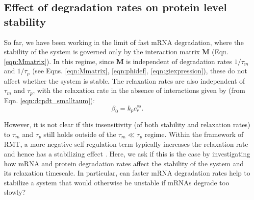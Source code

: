 \documentclass[10pt]{article}
\begin{document}




\subsection*{Effect of degradation rates on protein level stability}
So far, we have been working in the limit of fast mRNA degradation, where the stability of the system is governed only by the interaction matrix $\mathbf{M}$ (Eqn. \ref{eqn:Mmatrix}). In this regime, since $\mathbf{M}$ is independent of degradation rates $1/\tau_m$ and $1/\tau_p$ (see Eqns. \ref{eqn:Mmatrix}, \ref{eqn:phidef}, \ref{eqn:giexpression}), these do not affect whether the system is stable. The relaxation rates are also independent of $\tau_m$ and $\tau_p$, with the relaxation rate in the absence of interactions given by (from Eqn. \ref{eqn:dcpdt_smalltaum}):
\begin{equation}
    \beta_0 = k_p c_r^{ss}.
\end{equation}

However, it is not clear if this insensitivity (of both stability and relaxation rates) to $\tau_m$ and $\tau_p$ still holds outside of the $\tau_m \ll \tau_p$ regime. Within the framework of RMT, a more negative self-regulation term typically increases the relaxation rate and hence has a stabilizing effect \cite{may1972will}. Here, we ask if this is the case by investigating how mRNA and protein degradation rates affect the stability of the system and its relaxation timescale. In particular, can faster mRNA degradation rates help to stabilize a system that would otherwise be unstable if mRNAs degrade too slowly? 

\end{document}
